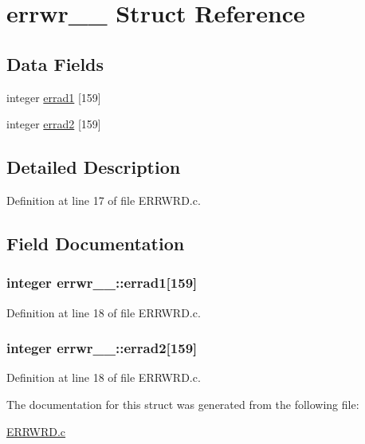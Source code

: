 \hypertarget{structerrwr__1__}{}\section{errwr\+\_\+\_\+ Struct Reference}
\label{structerrwr__1__}
\subsection*{Data Fields}
\begin{DoxyCompactItemize}
\item 
integer \hyperlink{structerrwr__1___a0307d3db8d6963bebb99b25a4762befb}{errad1} \mbox{[}159\mbox{]}
\item 
integer \hyperlink{structerrwr__1___a872ec2eaee4f9228e95fd61b2aa55c5c}{errad2} \mbox{[}159\mbox{]}
\end{DoxyCompactItemize}


\subsection{Detailed Description}


Definition at line 17 of file E\+R\+R\+W\+R\+D.\+c.



\subsection{Field Documentation}
\subsubsection[{\texorpdfstring{errad1}{errad1}}]{\setlength{\rightskip}{0pt plus 5cm}integer errwr\+\_\+\_\+\+::errad1\mbox{[}159\mbox{]}}\hypertarget{structerrwr__1___a0307d3db8d6963bebb99b25a4762befb}{}\label{structerrwr__1___a0307d3db8d6963bebb99b25a4762befb}


Definition at line 18 of file E\+R\+R\+W\+R\+D.\+c.

\subsubsection[{\texorpdfstring{errad2}{errad2}}]{\setlength{\rightskip}{0pt plus 5cm}integer errwr\+\_\+\_\+\+::errad2\mbox{[}159\mbox{]}}\hypertarget{structerrwr__1___a872ec2eaee4f9228e95fd61b2aa55c5c}{}\label{structerrwr__1___a872ec2eaee4f9228e95fd61b2aa55c5c}


Definition at line 18 of file E\+R\+R\+W\+R\+D.\+c.



The documentation for this struct was generated from the following file\+:\begin{DoxyCompactItemize}
\item 
\hyperlink{ERRWRD_8c}{E\+R\+R\+W\+R\+D.\+c}\end{DoxyCompactItemize}
